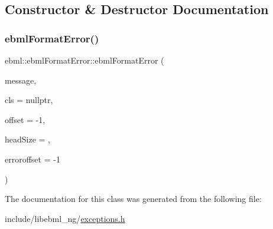 \subsection{Constructor \& Destructor Documentation}
\mbox{\label{classebml_1_1ebmlFormatError_a49a8a445d4f385f34d79095504e2363d}} 
\subsubsection{\texorpdfstring{ebml\+Format\+Error()}{ebmlFormatError()}}
{\footnotesize\ttfamily ebml\+::ebml\+Format\+Error\+::ebml\+Format\+Error (\begin{DoxyParamCaption}\item[{const std\+::string \&}]{message,  }\item[{const \mbox{\hyperlink{classebml_1_1ebmlElementClass}{ebml\+Element\+Class}} $\ast$}]{cls = {\ttfamily nullptr},  }\item[{off\+\_\+t}]{offset = {\ttfamily -\/1},  }\item[{unsigned char}]{head\+Size = {},  }\item[{off\+\_\+t}]{erroroffset = {\ttfamily -\/1} }\end{DoxyParamCaption})}



The documentation for this class was generated from the following file\+:\begin{DoxyCompactItemize}
\item 
include/libebml\+\_\+ng/\mbox{\hyperlink{exceptions_8h}{exceptions.\+h}}\end{DoxyCompactItemize}
